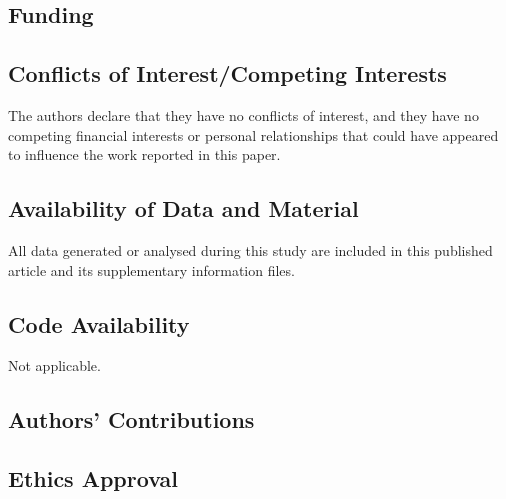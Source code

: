 \subsection*{Funding}
	
	
\subsection*{Conflicts of Interest/Competing Interests}
	
The authors declare that they have no conflicts of interest, and they have no competing financial interests or personal relationships that could have appeared to influence the work reported in this paper.
	
\subsection*{Availability of Data and Material}
	
All data generated or analysed during this study are included in this published article and its supplementary information files.
	
\subsection*{Code Availability}
	
Not applicable.
	
\subsection*{Authors' Contributions}
	
	
\subsection*{Ethics Approval}
	

